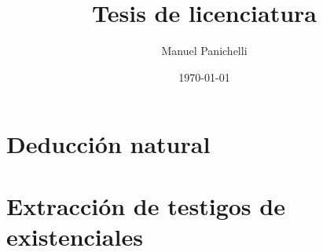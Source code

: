 \documentclass{report}
\title{Tesis de licenciatura}
\author{
    Manuel Panichelli
}
\date{\today}
\begin{document}
\maketitle

\chapter{Deducción natural}




\chapter{Extracción de testigos de existenciales}



\printbibliography
\end{document}
